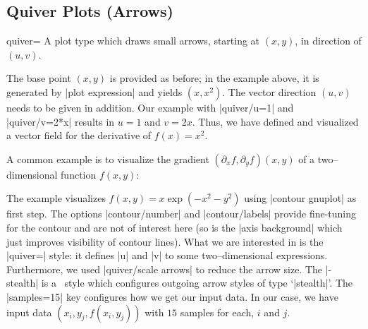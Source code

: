 {\subsection{Quiver Plots (Arrows)}
\label{sec:pgfplots:quiver2d}
\begin{plottype}[/pgfplots]{quiver=\textcolor{black}{}}
	A plot type which draws small arrows, starting at $(x,y)$, in direction of $(u,v)$.
\begin{codeexample}[]
\end{codeexample}

	The base point $(x,y)$ is provided as before; in the example above, it is generated by |plot expression| and yields $(x,x^2)$. The vector direction $(u,v)$ needs to be given in addition. Our example with |quiver/u=1| and |quiver/v=2*x| results in $u=1$ and $v=2x$. Thus, we have defined and visualized a vector field for the derivative of $f(x) = x^2$.

	A common example is to visualize the gradient $(\partial_x f,\partial_y f)(x,y)$ of a two--dimensional function $f(x,y)$:
\pgfplotsexpensiveexample
\begin{codeexample}[]
\end{codeexample}
	\noindent The example visualizes $f(x,y) = x\exp(-x^2-y^2)$ using |contour gnuplot| as first step. The options |contour/number| and |contour/labels| provide fine-tuning for the contour and are not of interest here (so is the |axis background| which just improves visibility of contour lines). What we are interested in is the |quiver=| style: it defines |u| and |v| to some two--dimensional expressions. Furthermore, we used |quiver/scale arrows| to reduce the arrow size. The |-stealth| is a \Tikz\ style which configures outgoing arrow styles of type `|stealth|'. The |samples=15| key configures how we get our input data. In our case, we have input data $(x_i,y_j,f(x_i,y_j))$ with $15$ samples for each, $i$ and $j$.


\end{plottype}}

